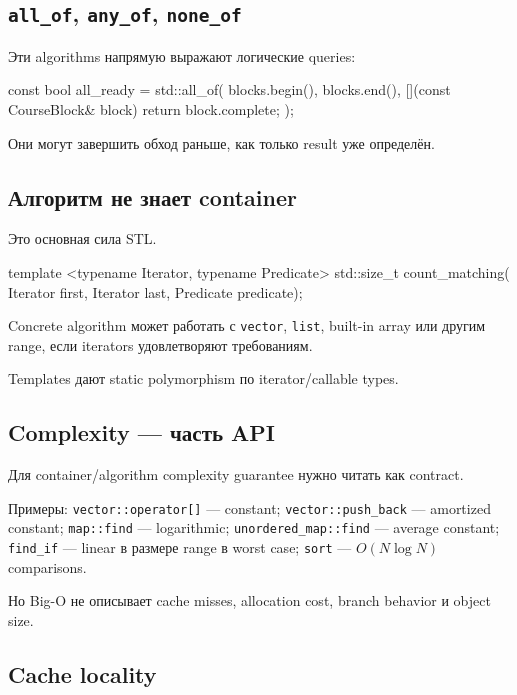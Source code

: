 \subsection{\texttt{all\_of}, \texttt{any\_of}, \texttt{none\_of}}

Эти algorithms напрямую выражают логические queries:

\begin{cppcode}
const bool all_ready = std::all_of(
    blocks.begin(),
    blocks.end(),
    [](const CourseBlock& block) {
        return block.complete;
    }
);
\end{cppcode}

Они могут завершить обход раньше, как только result уже определён.

\subsection{Алгоритм не знает container}

Это основная сила STL.

\begin{cppcode}
template <typename Iterator, typename Predicate>
std::size_t count_matching(
    Iterator first,
    Iterator last,
    Predicate predicate);
\end{cppcode}

Concrete algorithm может работать с \texttt{vector}, \texttt{list}, built-in
array или другим range, если iterators удовлетворяют требованиям.

Templates дают static polymorphism по iterator/callable types.

\subsection{Complexity --- часть API}

Для container/algorithm complexity guarantee нужно читать как contract.

Примеры:
\texttt{vector::operator[]} --- constant; \texttt{vector::push\_back} --- amortized constant; \texttt{map::find} --- logarithmic; \texttt{unordered\_map::find} --- average constant; \texttt{find\_if} --- linear в размере range в worst case; \texttt{sort} --- $O(N \log N)$ comparisons.

Но Big-O не описывает cache misses, allocation cost, branch behavior и object
size.

\subsection{Cache locality}

